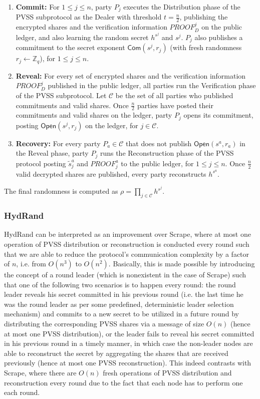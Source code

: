 \documentclass[11pt]{article}
\theoremstyle{definition}
\theoremstyle{remark}
\begin{document}
\begin{enumerate}
\item \textbf{Commit:} For $1 \leq j \leq n$, party $P_j$ executes the Distribution phase of the PVSS subprotocol as the Dealer with threshold $t = \frac{n}{2}$, publishing the encrypted shares and the verification information $PROOF_D^j$ on the public ledger, and also learning the random secret $h^{s^j}$ and $s^j$. $P_j$ also publishes a commitment to the secret exponent $\mathsf{Com}(s^j, r_j)$ (with fresh randomness $r_j \leftarrow \mathbb{Z}_q$), for $1 \leq j \leq n$.
\item \textbf{Reveal:} For every set of encrypted shares and the verification information $PROOF_D^j$ published in the public ledger, all parties run the Verification phase of the PVSS subprotocol. Let $\mathcal{C}$ be the set of all parties who published commitments and valid shares. Once $\frac{n}{2}$ parties have posted their commitments and valid shares on the ledger, party $P_j$ opens its commitment, posting $\mathsf{Open}(s^j, r_j)$ on the ledger, for $j \in \mathcal{C}$.
\item \textbf{Recovery:} For every party $P_a \in \mathcal{C}$ that does not publish $\mathsf{Open}(s^a, r_a)$ in the Reveal phase, party $P_j$ runs the Reconstruction phase of the PVSS protocol posting $\tilde{s}_j^a$ and $PROOF_j^a$ to the public ledger, for $1 \leq j \leq n$. Once $\frac{n}{2}$ valid decrypted shares are published, every party reconstructs $h^{s^a}$.
\end{enumerate}

The final randomness is computed as $\rho = \prod_{j \in \mathcal{C}} h^{s^j}$.

\subsubsection{HydRand}
HydRand can be interpreted as an improvement over Scrape, where at most one operation of PVSS distribution or reconstruction is conducted every round such that we are able to reduce the protocol's communication complexity by a factor of $n$, i.e. from $O(n^3)$ to $O(n^2)$. Basically, this is made possible by introducing the concept of a round leader (which is nonexistent in the case of Scrape) such that one of the following two scenarios is to happen every round: the round leader reveals his secret committed in his previous round (i.e. the last time he was the round leader as per some predefined, deterministic leader selection mechanism) and commits to a new secret to be utilized in a future round by distributing the corresponding PVSS shares via a message of size $O(n)$ (hence at most one PVSS distribution), or the leader fails to reveal his secret committed in his previous round in a timely manner, in which case the non-leader nodes are able to reconstruct the secret by aggregating the shares that are received previously (hence at most one PVSS reconstruction). This indeed contrasts with Scrape, where there are $O(n)$ fresh operations of PVSS distribution and reconstruction every round due to the fact that each node has to perform one each round.
\end{document}
